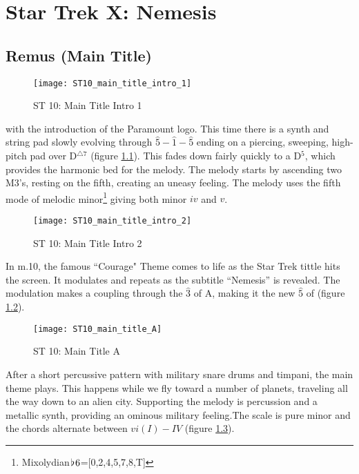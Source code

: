 
\chapter{Star Trek X: Nemesis}

\section{Remus (Main Title)}\label{sec:st 10}
\begin{figure}
\center
\texttt{[image: ST10\_main\_title\_intro\_1]}
	\caption{ST 10: Main Title Intro 1}
	\label{ST10_main_title_intro_1}
\end{figure}

\noindent{} with the introduction of the Paramount logo. This time there is a synth and string pad slowly evolving through \(\hat{5}-\hat{1}-\hat{5}\) ending on a piercing, sweeping, high-pitch pad over D\(^{\triangle 7}\) (figure \ref{ST10_main_title_intro_1}). This fades down fairly quickly to a D\(^{5}\), which provides the harmonic bed for the melody. The melody starts by ascending two M3's, resting on the fifth, creating an uneasy feeling. The melody uses the fifth mode of melodic minor\footnote{Mixolydian\(\hspace*{0.18ex}\flat\hspace*{0.18ex}{6}\)=[0,2,4,5,7,8,T]} giving both minor \(iv\) and \(v\). 

\begin{figure}
\center
\texttt{[image: ST10\_main\_title\_intro\_2]}
	\caption{ST 10: Main Title Intro 2}
	\label{ST10_main_title_intro_2}
\end{figure}
In m.10, the famous ``Courage" Theme comes to life as the Star Trek tittle hits the screen. It modulates and repeats as the subtitle ``Nemesis'' is revealed. The modulation makes a coupling through the \(\hat{3}\) of A, making it the new \(\hat{5}\) of \fiss (figure \ref{ST10_main_title_intro_2}).

\begin{figure}
\center
\texttt{[image: ST10\_main\_title\_A]}
	\caption{ST 10: Main Title A}
	\label{ST10_main_title_A}
\end{figure}
After a short percussive pattern with military snare drums and timpani, the main theme plays. This happens while we fly toward a number of planets, traveling all the way down to an alien city. Supporting the melody is percussion and a metallic synth, providing an ominous military feeling.The scale is pure minor and the chords alternate between \(vi(I)-IV\) (figure \ref{ST10_main_title_A}).

